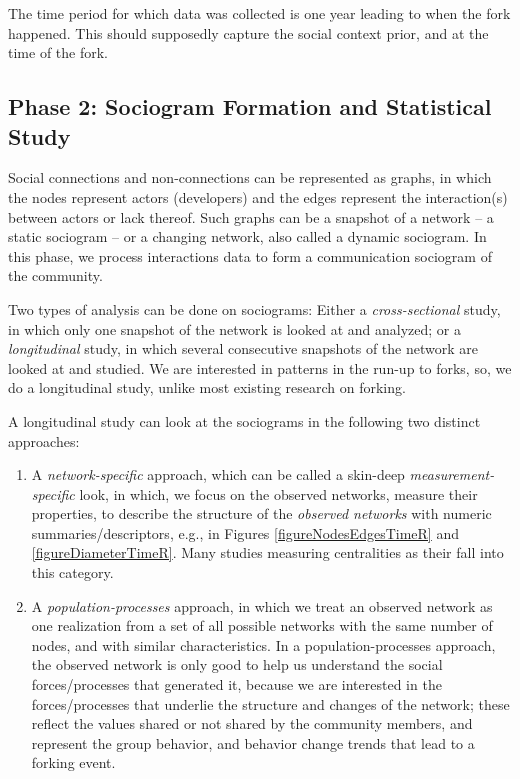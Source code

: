\documentclass[11pt]{report}
\begin{document}
The time period for which data was collected is one year leading to when the fork happened. This should supposedly capture the social context prior, and at the time of the fork.

\subsection{Phase 2: Sociogram Formation and Statistical Study}

Social connections and non-connections can be represented as graphs, in which the nodes represent actors (developers) and the edges represent the interaction(s) between actors or lack thereof. Such graphs can be a snapshot of a network -- a static sociogram -- or a changing network, also called a dynamic sociogram. In this phase, we process interactions data to form a communication sociogram of the community. 

Two types of analysis can be done on sociograms: Either a \textit{cross-sectional} study, in which only one snapshot of the network is looked at and analyzed; or a \textit{longitudinal} study, in which several consecutive snapshots of the network are looked at and studied.  We are interested in patterns in the run-up to forks, so, we do a longitudinal study, unlike most existing research on forking.

A longitudinal study can look at the sociograms in the following two distinct approaches: 
\begin{enumerate}
\item A \textit{network-specific} approach, which can be called a skin-deep \textit{measurement-specific} look, in which, we focus on the observed networks, measure their properties, to describe the structure of the \textit{observed networks} with numeric summaries/descriptors, e.g., in Figures \ref{figureNodesEdgesTimeR} and \ref{figureDiameterTimeR}. Many studies measuring centralities as their fall into this category. 

\item A \textit{population-processes} approach, in which we treat an observed network as one realization from a set of all possible networks with the same number of nodes, and with similar characteristics. In a population-processes approach, the observed network is only good to help us understand the social forces/processes that generated it, because we are interested in the forces/processes that underlie the structure and changes of the network; these reflect the values shared or not shared by the community members, and represent the group behavior, and behavior change trends that lead to a forking event. 

\end{enumerate}
\end{document}
